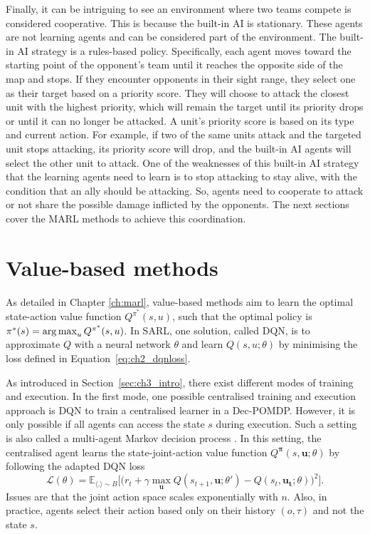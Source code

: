 Finally, it can be intriguing to see an environment where two teams compete is considered cooperative.
This is because the built-in AI is stationary. 
These agents are not learning agents and can be considered part of the environment.
The built-in AI strategy is a rules-based policy.
Specifically, each agent moves toward the starting point of the opponent's team until it reaches the opposite side of the map and stops.
If they encounter opponents in their sight range, they select one as their target based on a priority score.
They will choose to attack the closest unit with the highest priority, which will remain the target until its priority drops or until it can no longer be attacked.
A unit's priority score is based on its type and current action.
For example, if two of the same units attack and the targeted unit stops attacking, its priority score will drop, and the built-in AI agents will select the other unit to attack.
One of the weaknesses of this built-in AI strategy that the learning agents need to learn is to stop attacking to stay alive, with the condition that an ally should be attacking.
So, agents need to cooperate to attack or not share the possible damage inflicted by the opponents.
The next sections cover the MARL methods to achieve this coordination.

\section{Value-based methods}
\label{sec:ch3_value}

As detailed in Chapter \ref{ch:marl}, value-based methods aim to learn the optimal state-action value function $Q^{\pi^*}(s, u)$, such that the optimal policy is $\pi^*(s)=\operatorname*{arg\,max}_{u} Q^{\pi^*}(s, u)$.
In SARL, one solution, called DQN, is to approximate $Q$ with a neural network $\theta$ and learn $Q(s, u;\theta)$
by minimising the loss defined in Equation~\ref{eq:ch2_dqnloss}.

As introduced in Section~\ref{sec:ch3_intro}, there exist different modes of training and execution.
In the first mode, one possible centralised training and execution approach is DQN to train a centralised learner in a Dec-POMDP.
However, it is only possible if all agents can access the state $s$ during execution.
Such a setting is also called a multi-agent Markov decision process \citep{boutilier1996planning}.
In this setting, the centralised agent learns the state-joint-action value function $Q^{\boldsymbol{\pi}}(s,\mathbf{u}; \theta)$ by following the adapted DQN loss
\begin{equation}
\label{eq:ch3_centralQloss}
    \mathcal{L}(\theta) = \mathbb{E}_{\langle . \rangle\sim B} \big[\big(r_{t} + \gamma \max_{\mathbf{u}} Q(s_{t+1}, \mathbf{u}; \theta')- Q(s_{t}, \mathbf{\mathbf{u_t}}; \theta)\big)^{2}\big].
\end{equation}
Issues are that the joint action space scales exponentially with $n$.
Also, in practice, agents select their action based only on their history $(o, \tau)$ and not the state $s$.

